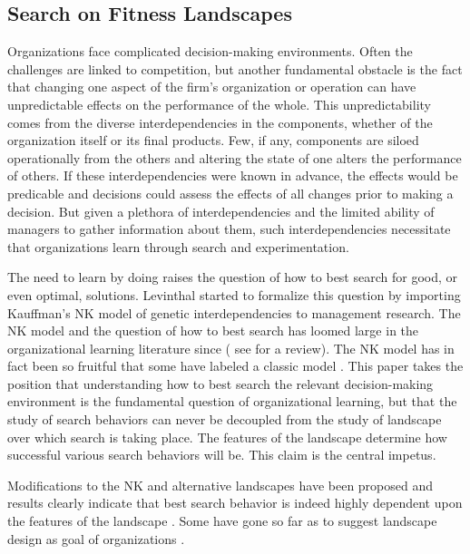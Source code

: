\documentclass[12pt]{article}
\author{Jon Atwell\\}
\begin{document}
\maketitle

\subsection*{Search on Fitness Landscapes}
Organizations face complicated decision-making environments. Often the challenges are linked to competition, but another fundamental obstacle is the fact that changing one aspect of the firm's organization or operation can have unpredictable effects on the performance of the whole. This unpredictability comes from the diverse interdependencies in the components, whether of the organization itself or its final products. Few, if any, components are siloed operationally from the others and altering the state of one alters the performance of others. If these interdependencies were known in advance, the effects would be predicable and decisions could assess the effects of all changes prior to making a decision. But given a plethora of interdependencies and the limited ability of managers to gather information about them, such interdependencies necessitate that organizations learn through search and experimentation.

The need to learn by doing raises the question of how to best search for good, or even optimal, solutions. Levinthal \citeyearpar{Levinthal1997} started to formalize this question by importing Kauffman's NK model of genetic interdependencies \citep{Kauffman1989} to management research. The NK model and the question of how to best search has loomed large in the organizational learning literature since ( see \cite{Baumann2019} for a review). The NK model has in fact been so fruitful that some have labeled a classic model \cite{Borgonovo2020}. This paper takes the position that understanding how to best search the relevant decision-making environment is the fundamental question of organizational learning, but that the study of search behaviors can never be decoupled from the study of landscape over which search is taking place. The features of the landscape determine how successful various search behaviors will be.
This claim is the central impetus.

 Modifications to the NK and alternative landscapes have been proposed and results clearly indicate that best search behavior is indeed highly dependent upon the features of the landscape \cite{Rivkin2007,Winter2007,Callander2011,Rahmandad2019}. Some have gone so far as to suggest landscape design as goal of organizations \cite{Levinthal1999}.
\end{document}
